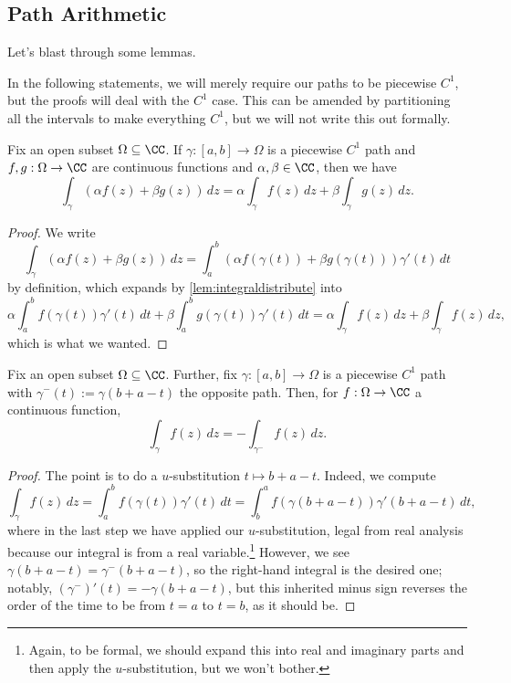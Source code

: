 \subsection{Path Arithmetic}
Let's blast through some lemmas.
\begin{warn}
	In the following statements, we will merely require our paths to be piecewise $C^1$, but the proofs will deal with the $C^1$ case. This can be amended by partitioning all the intervals to make everything $C^1$, but we will not write this out formally.
\end{warn}
\begin{lemma}
	Fix an open subset $\Omega\subseteq\CC$. If $\gamma:[a,b]\to\Omega$ is a piecewise $C^1$ path and $f,g:\Omega\to\CC$ are continuous functions and $\alpha,\beta\in\CC$, then we have
	\[\int_\gamma(\alpha f(z)+\beta g(z))\,dz=\alpha\int_\gamma f(z)\,dz+\beta\int_\gamma g(z)\,dz.\]
\end{lemma}
\begin{proof}
	We write
	\[\int_\gamma(\alpha f(z)+\beta g(z))\,dz=\int_a^b(\alpha f(\gamma(t))+\beta g(\gamma(t)))\gamma'(t)\,dt\]
	by definition, which expands by \autoref{lem:integraldistribute} into
	\[\alpha\int_a^bf(\gamma(t))\gamma'(t)\,dt+\beta\int_a^bg(\gamma(t))\gamma'(t)\,dt=\alpha\int_\gamma f(z)\,dz+\beta\int_\gamma f(z)\,dz,\]
	which is what we wanted.
\end{proof}
\begin{lemma} \label{lem:opposite}
	Fix an open subset $\Omega\subseteq\CC$. Further, fix $\gamma:[a,b]\to\Omega$ is a piecewise $C^1$ path with $\gamma^-(t):=\gamma(b+a-t)$ the opposite path. Then, for $f:\Omega\to\CC$ a continuous function,
	\[\int_\gamma f(z)\,dz=-\int_{\gamma^-}f(z)\,dz.\]
\end{lemma}
\begin{proof}
	The point is to do a $u$-substitution $t\mapsto b+a-t$. Indeed, we compute
	\[\int_\gamma f(z)\,dz=\int_a^bf(\gamma(t))\gamma'(t)\,dt=\int_b^af(\gamma(b+a-t))\gamma'(b+a-t)\,dt,\]
	where in the last step we have applied our $u$-substitution, legal from real analysis because our integral is from a real variable.\footnote{Again, to be formal, we should expand this into real and imaginary parts and then apply the $u$-substitution, but we won't bother.} However, we see $\gamma(b+a-t)=\gamma^-(b+a-t)$, so the right-hand integral is the desired one; notably, $(\gamma^-)'(t)=-\gamma(b+a-t)$, but this inherited minus sign reverses the order of the time to be from $t=a$ to $t=b$, as it should be.
\end{proof}
